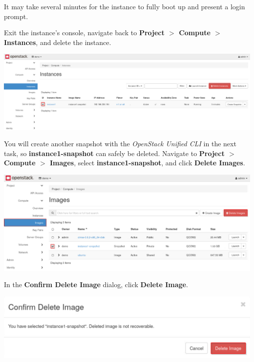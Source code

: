 \documentclass[letterpaper, 12pt]{article}
\begin{document}
\begin{enumerate}
    \begin{notebox}
        It may take several minutes for the instance to fully boot up and present a login prompt.
    \end{notebox}

    \begin{labstep}
        Exit the instance's console, navigate back to \textbf{Project $>$ Compute $>$ Instances}, and delete the instance.

        \begin{center}
            \includegraphics[width=\linewidth]{images/part1/step20.png}
        \end{center}
    \end{labstep}

    \begin{labstep}
        You will create another snapshot with the \textit{OpenStack Unified CLI} in the next task, so \textbf{instance1-snapshot} can safely be deleted.
        Navigate to \textbf{Project $>$ Compute $>$ Images}, select \textbf{instance1-snapshot}, and click \textbf{Delete Images}.

        \begin{center}
            \includegraphics[width=\linewidth]{images/part1/step21.png}
        \end{center}
    \end{labstep}

    \begin{labstep}
        In the \textbf{Confirm Delete Image} dialog, click \textbf{Delete Image}.

        \begin{center}
            \includegraphics[width=\linewidth]{images/part1/step22.png}
        \end{center}
    \end{labstep}


\end{enumerate}
\end{document}
